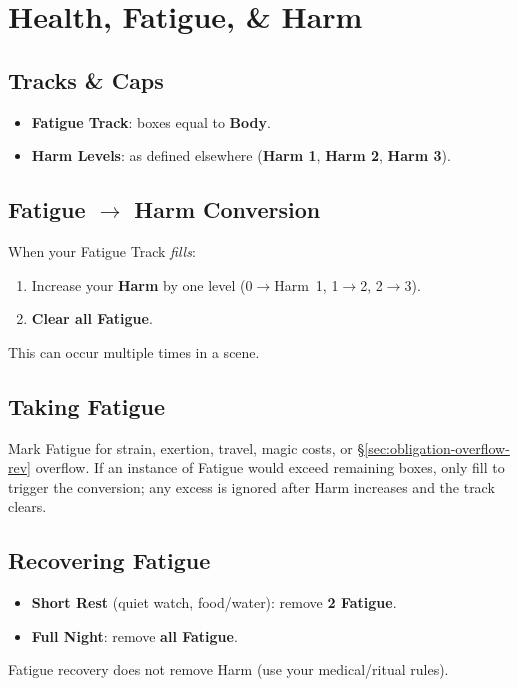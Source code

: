 \section{Health, Fatigue, \& Harm} 
\label{sec:health-fatigue-harm-rev}

\subsection*{Tracks \& Caps}
\begin{itemize}
  \item \textbf{Fatigue Track}: boxes equal to \textbf{Body}.
  \item \textbf{Harm Levels}: as defined elsewhere (\textbf{Harm 1}, \textbf{Harm 2}, \textbf{Harm 3}).
\end{itemize}

\subsection*{Fatigue $\rightarrow$ Harm Conversion}
When your Fatigue Track \emph{fills}:
\begin{enumerate}
  \item Increase your \textbf{Harm} by one level (0$\rightarrow$Harm~1, 1$\rightarrow$2, 2$\rightarrow$3).
  \item \textbf{Clear all Fatigue}.
\end{enumerate}
This can occur multiple times in a scene.

\subsection*{Taking Fatigue}
Mark Fatigue for strain, exertion, travel, magic costs, or \S\ref{sec:obligation-overflow-rev} overflow. If an instance of Fatigue would exceed remaining boxes, only fill to trigger the conversion; any excess is ignored after Harm increases and the track clears.

\subsection*{Recovering Fatigue}
\begin{itemize}
  \item \textbf{Short Rest} (quiet watch, food/water): remove \textbf{2 Fatigue}.
  \item \textbf{Full Night}: remove \textbf{all Fatigue}.
\end{itemize}
Fatigue recovery does not remove Harm (use your medical/ritual rules).

